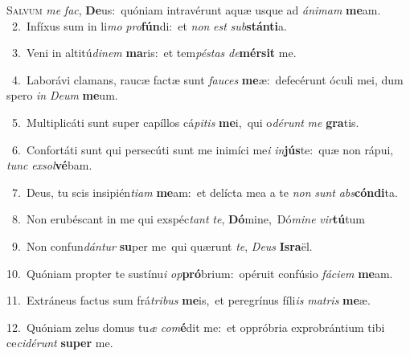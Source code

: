 \lettrine{\initial\textcolor{\initialcolor}{S}}{alvum} \textit{me} \textit{fac}\-, \textbf{De}\-us:~\star quóniam intravérunt aquæ usque ad \textit{á}\-\textit{ni}\textit{mam} \textbf{me}\-am.\\
{\numbfont\textcolor{\numbcolor}{~2.}}~Infíxus sum in li\textit{mo} \textit{pro}\-\textbf{fún}di:~\star et \textit{non} \textit{est} \textit{sub}\-\textbf{stán}\textbf{ti}a.\par
{\numbfont\textcolor{\numbcolor}{~3.}}~Veni in altitú\-\textit{di}\-\textit{nem} \textbf{ma}\-ris:~\star et tem\-\textit{pés}\-\textit{tas} \textit{de}\-\textbf{mér}\textbf{sit} me.\par
{\numbfont\textcolor{\numbcolor}{~4.}}~Laborávi clamans, raucæ factæ sunt \textit{fau}\-\textit{ces} \textbf{me}\-æ:~\star defecérunt óculi mei, dum spero \textit{in} \textit{De}\-\textit{um} \textbf{me}\-um.\par
{\numbfont\textcolor{\numbcolor}{~5.}}~Multiplicáti sunt super capíllos cá\-\textit{pi}\-\textit{tis} \textbf{me}\-i,~\star qui o\-\textit{dé}\-\textit{runt} \textit{me} \textbf{gra}\-tis.\par
{\numbfont\textcolor{\numbcolor}{~6.}}~Confortáti sunt qui persecúti sunt me inimíci me\textit{i} \textit{in}\-\textbf{jús}te:~\star quæ non rápui, \textit{tunc} \textit{ex}\-\textit{sol}\textbf{vé}bam.\par
{\numbfont\textcolor{\numbcolor}{~7.}}~Deus, tu scis insipién\-\textit{ti}\-\textit{am} \textbf{me}\-am:~\star et delícta mea a te \textit{non} \textit{sunt} \textit{abs}\-\textbf{cón}\textbf{di}ta.\par
{\numbfont\textcolor{\numbcolor}{~8.}}~Non erubéscant in me qui exspéc\textit{tant} \textit{te}\-, \textbf{Dó}\-mine,~\star Dó\-\textit{mi}\-\textit{ne} \textit{vir}\-\textbf{tú}tum\par
{\numbfont\textcolor{\numbcolor}{~9.}}~Non confun\-\textit{dán}\-\textit{tur} \textbf{su}\-per me~\star qui quærunt \textit{te}\-, \textit{De}\-\textit{us} \textbf{Is}\-\textbf{ra}ël.\par
{\numbfont\textcolor{\numbcolor}{10.}}~Quóniam propter te sustínu\textit{i} \textit{op}\-\textbf{pró}brium:~\star opéruit confúsio \textit{fá}\-\textit{ci}\textit{em} \textbf{me}\-am.\par
{\numbfont\textcolor{\numbcolor}{11.}}~Extráneus factus sum frá\-\textit{tri}\-\textit{bus} \textbf{me}\-is,~\star et peregrínus fíli\textit{is} \textit{ma}\-\textit{tris} \textbf{me}\-æ.\par
{\numbfont\textcolor{\numbcolor}{12.}}~Quóniam zelus domus tu\textit{æ} \textit{com}\-\textbf{é}dit me:~\star et oppróbria exprobrántium tibi ce\-\textit{ci}\-\textit{dé}\textit{runt} \textbf{su}\-\textbf{per} me.\par
